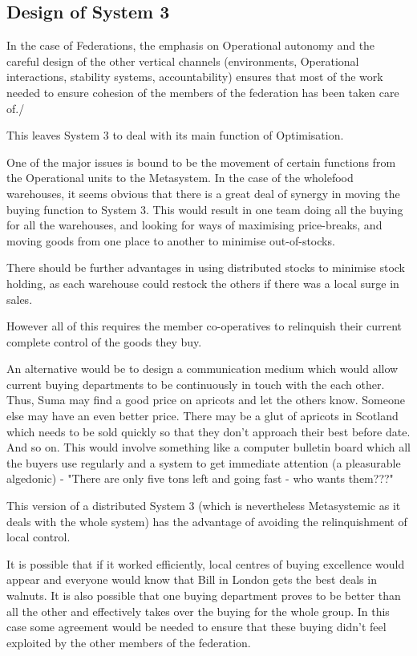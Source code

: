 \subsection*{Design of System 3}
In the case of Federations, the emphasis on Operational autonomy and the careful design of the other vertical channels (environments, Operational interactions, stability systems, accountability) ensures that most of the work needed to ensure cohesion of the members of the federation has been taken care of./

This leaves System 3 to deal with its main function of Optimisation.

One of the major issues is bound to be the movement of certain functions from the Operational units to the Metasystem. In the case of the wholefood warehouses, it seems obvious that there is a great deal of synergy in moving the buying function to System 3. This would result in one team doing all the buying for all the warehouses, and looking for ways of maximising price-breaks, and moving goods from one place to another to minimise out-of-stocks.

There should be further advantages in using distributed stocks to minimise stock holding, as each warehouse could restock the others if there was a local surge in sales.

However all of this requires the member co-operatives to relinquish their current complete control of the goods they buy.

An alternative would be to design a communication medium which would allow current buying departments to be continuously in touch with the each other. Thus, Suma may find a good price on apricots and let the others know. Someone else may have an even better price. There may be a glut of apricots in Scotland which needs to be sold quickly so that they don't approach their best before date. And so on. This would involve something like a computer bulletin board which all the buyers use regularly and a system to get immediate attention (a pleasurable algedonic) - "There are only five tons left and going fast - who wants them???"

This version of a distributed System 3 (which is nevertheless Metasystemic as it deals with the whole system) has the advantage of avoiding the relinquishment of local control.

It is possible that if it worked efficiently, local centres of buying excellence would appear and everyone would know that Bill in London gets the best deals in walnuts. It is also possible that one buying department proves to be better than all the other and effectively takes over the buying for the whole group. In this case some agreement would be needed to ensure that these buying didn't feel exploited by the other members of the federation.

